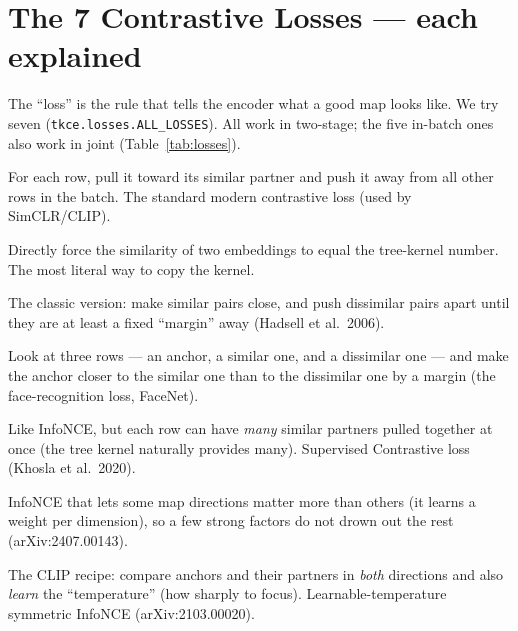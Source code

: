 \documentclass[11pt]{article}
\newcommand{\code}[1]{\texttt{#1}}
\begin{document}
\section{The 7 Contrastive Losses --- each explained}
The ``loss'' is the rule that tells the encoder what a good map looks like. We try
seven (\code{tkce.losses.ALL\_LOSSES}). All work in two-stage; the five in-batch
ones also work in joint (Table~\ref{tab:losses}).

\begin{description}[leftmargin=2.6em,style=nextline,itemsep=2pt]
  \item[\code{infonce}] For each row, pull it toward its similar partner and push
  it away from all other rows in the batch. The standard modern contrastive loss
  (used by SimCLR/CLIP).
  \item[\code{kernel\_regression}] Directly force the similarity of two embeddings
  to equal the tree-kernel number. The most literal way to copy the kernel.
  \item[\code{contrastive}] The classic version: make similar pairs close, and push
  dissimilar pairs apart until they are at least a fixed ``margin'' away (Hadsell
  et al.\ 2006).
  \item[\code{triplet}] Look at three rows --- an anchor, a similar one, and a
  dissimilar one --- and make the anchor closer to the similar one than to the
  dissimilar one by a margin (the face-recognition loss, FaceNet).
  \item[\code{supcon}] Like InfoNCE, but each row can have \emph{many} similar
  partners pulled together at once (the tree kernel naturally provides many).
  Supervised Contrastive loss (Khosla et al.\ 2020).
  \item[\code{aninfonce}] InfoNCE that lets some map directions matter more than
  others (it learns a weight per dimension), so a few strong factors do not drown
  out the rest (arXiv:2407.00143).
  \item[\code{clip\_infonce}] The CLIP recipe: compare anchors and their partners in
  \emph{both} directions and also \emph{learn} the ``temperature'' (how sharply to
  focus). Learnable-temperature symmetric InfoNCE (arXiv:2103.00020).
\end{description}
\end{document}
